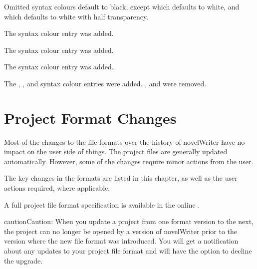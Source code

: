 \documentclass[a4paper,11pt,english]{sphinxmanual}
\begin{document}
\sphinxAtStartPar
Omitted syntax colours default to black, except  which defaults to white, and
 which defaults to white with half transparency.

\sphinxAtStartPar
{}The  syntax colour entry was added.

\sphinxAtStartPar
{}The  syntax colour entry was added.

\sphinxAtStartPar
{}The  syntax colour entry was added.

\sphinxAtStartPar
{}The , ,  and  syntax colour entries were added.
,  and  were removed.

\sphinxstepscope


\chapter{Project Format Changes}
\label{\detokenize{more_projectformat:project-format-changes}}\label{\detokenize{more_projectformat:a-prjfmt}}\label{\detokenize{more_projectformat::doc}}
\sphinxAtStartPar
Most of the changes to the file formats over the history of novelWriter have no impact on the
user side of things. The project files are generally updated automatically. However, some of the
changes require minor actions from the user.

\sphinxAtStartPar
The key changes in the formats are listed in this chapter, as well as the user actions required,
where applicable.

\sphinxAtStartPar
A full project file format specification is available in the online .

\begin{sphinxadmonition}{caution}{Caution:}
\sphinxAtStartPar
When you update a project from one format version to the next, the project can no longer be
opened by a version of novelWriter prior to the version where the new file format was
introduced. You will get a notification about any updates to your project file format and will
have the option to decline the upgrade.
\end{sphinxadmonition}
\end{document}
